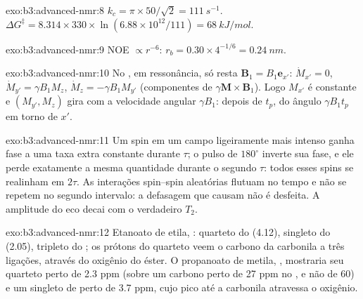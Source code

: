 \begin{solution}{exo:b3:advanced-nmr:8}
$k_c = \pi \times 50/\sqrt2 = \qty{111}{s^{-1}}$. $\Delta G^\ddagger = 8.314 \times 330 \times
\ln(6.88\times10^{12}/111) = \qty{68}{kJ/mol}$.
\end{solution}

\begin{solution}{exo:b3:advanced-nmr:9}
NOE $\propto r^{-6}$: $r_b = 0.30 \times 4^{-1/6} = \qty{0.24}{nm}$.
\end{solution}

\begin{solution}{exo:b3:advanced-nmr:10}
No , em ressonância, só resta $\mathbf B_1 = B_1\mathbf e_{x'}$:
$\dot M_{x'} = 0$, $\dot M_{y'} = \gamma B_1M_z$, $\dot M_z = -\gamma B_1M_{y'}$ (componentes de
$\gamma\mathbf M\times\mathbf B_1$). Logo $M_{x'}$ é constante e $(M_{y'}, M_z)$ gira com a velocidade
angular $\gamma B_1$: depois de $t_p$, do ângulo $\gamma B_1t_p$ em torno de $x'$.
\end{solution}

\begin{solution}{exo:b3:advanced-nmr:11}
Um spin em um campo ligeiramente mais intenso ganha fase a uma taxa extra
constante durante $\tau$; o pulso de $180^\circ$ inverte sua fase, e ele perde exatamente a
mesma quantidade durante o segundo $\tau$: todos esses spins se realinham em $2\tau$. As
interações spin--spin aleatórias flutuam no tempo e não se repetem no segundo
intervalo: a defasagem que causam não é desfeita. A amplitude do eco decai com o verdadeiro $T_2$.
\end{solution}

\begin{solution}{exo:b3:advanced-nmr:12}
Etanoato de etila, : quarteto do  (4.12), singleto do  (2.05),
tripleto do ; os prótons do quarteto veem o carbono da carbonila a três ligações,
através do oxigênio do éster. O propanoato de metila, , mostraria seu
quarteto perto de 2.3 ppm (sobre um carbono perto de 27 ppm no , e não de 60) e um singleto
de  perto de 3.7 ppm, cujo pico  até a carbonila atravessa o oxigênio.
\end{solution}

